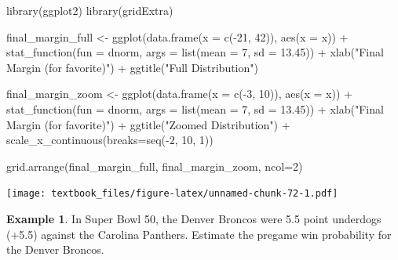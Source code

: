 \documentclass[
  11pt,
]{book}
\newenvironment{Shaded}{\begin{snugshade}}{\end{snugshade}}
\newcommand{\AttributeTok}[1]{\textcolor[rgb]{0.77,0.63,0.00}{#1}}
\newcommand{\DecValTok}[1]{\textcolor[rgb]{0.00,0.00,0.81}{#1}}
\newcommand{\FloatTok}[1]{\textcolor[rgb]{0.00,0.00,0.81}{#1}}
\newcommand{\FunctionTok}[1]{\textcolor[rgb]{0.00,0.00,0.00}{#1}}
\newcommand{\NormalTok}[1]{#1}
\newcommand{\OtherTok}[1]{\textcolor[rgb]{0.56,0.35,0.01}{#1}}
\newcommand{\SpecialCharTok}[1]{\textcolor[rgb]{0.00,0.00,0.00}{#1}}
\newcommand{\StringTok}[1]{\textcolor[rgb]{0.31,0.60,0.02}{#1}}
\theoremstyle{definition}
\theoremstyle{definition}
\newtheorem{example}{Example}[chapter]
\theoremstyle{definition}
\theoremstyle{definition}
\theoremstyle{remark}
\begin{document}
\begin{Shaded}
\begin{Highlighting}[]
\FunctionTok{library}\NormalTok{(ggplot2)}
\FunctionTok{library}\NormalTok{(gridExtra)}


\NormalTok{final\_margin\_full }\OtherTok{\textless{}{-}} \FunctionTok{ggplot}\NormalTok{(}\FunctionTok{data.frame}\NormalTok{(}\AttributeTok{x =} \FunctionTok{c}\NormalTok{(}\SpecialCharTok{{-}}\DecValTok{21}\NormalTok{, }\DecValTok{42}\NormalTok{)), }\FunctionTok{aes}\NormalTok{(}\AttributeTok{x =}\NormalTok{ x)) }\SpecialCharTok{+}
        \FunctionTok{stat\_function}\NormalTok{(}\AttributeTok{fun =}\NormalTok{ dnorm, }\AttributeTok{args =} \FunctionTok{list}\NormalTok{(}\AttributeTok{mean =} \DecValTok{7}\NormalTok{, }\AttributeTok{sd =} \FloatTok{13.45}\NormalTok{)) }\SpecialCharTok{+} 
  \FunctionTok{xlab}\NormalTok{(}\StringTok{"Final Margin (for favorite)"}\NormalTok{) }\SpecialCharTok{+} \FunctionTok{ggtitle}\NormalTok{(}\StringTok{"Full Distribution"}\NormalTok{)}

\NormalTok{final\_margin\_zoom }\OtherTok{\textless{}{-}} \FunctionTok{ggplot}\NormalTok{(}\FunctionTok{data.frame}\NormalTok{(}\AttributeTok{x =} \FunctionTok{c}\NormalTok{(}\SpecialCharTok{{-}}\DecValTok{3}\NormalTok{, }\DecValTok{10}\NormalTok{)), }\FunctionTok{aes}\NormalTok{(}\AttributeTok{x =}\NormalTok{ x)) }\SpecialCharTok{+}
        \FunctionTok{stat\_function}\NormalTok{(}\AttributeTok{fun =}\NormalTok{ dnorm, }\AttributeTok{args =} \FunctionTok{list}\NormalTok{(}\AttributeTok{mean =} \DecValTok{7}\NormalTok{, }\AttributeTok{sd =} \FloatTok{13.45}\NormalTok{)) }\SpecialCharTok{+} 
  \FunctionTok{xlab}\NormalTok{(}\StringTok{"Final Margin (for favorite)"}\NormalTok{) }\SpecialCharTok{+} \FunctionTok{ggtitle}\NormalTok{(}\StringTok{"Zoomed Distribution"}\NormalTok{) }\SpecialCharTok{+} 
  \FunctionTok{scale\_x\_continuous}\NormalTok{(}\AttributeTok{breaks=}\FunctionTok{seq}\NormalTok{(}\SpecialCharTok{{-}}\DecValTok{2}\NormalTok{, }\DecValTok{10}\NormalTok{, }\DecValTok{1}\NormalTok{))}

\FunctionTok{grid.arrange}\NormalTok{(final\_margin\_full, final\_margin\_zoom, }\AttributeTok{ncol=}\DecValTok{2}\NormalTok{)}
\end{Highlighting}
\end{Shaded}

\texttt{[image: textbook\_files/figure-latex/unnamed-chunk-72-1.pdf]}

\newpage

\begin{example}
In Super Bowl 50, the Denver Broncos were 5.5 point underdogs (+5.5) against the Carolina Panthers. Estimate the pregame win probability for the Denver Broncos.\\

\end{example}
\end{document}
